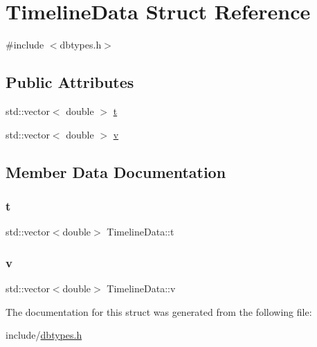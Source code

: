 \hypertarget{struct_timeline_data}{}\section{Timeline\+Data Struct Reference}
\label{struct_timeline_data}


{\ttfamily \#include $<$dbtypes.\+h$>$}

\subsection*{Public Attributes}
\begin{DoxyCompactItemize}
\item 
std\+::vector$<$ double $>$ \mbox{\hyperlink{struct_timeline_data_a55252a3a044701c453ad58cbf35b387c}{t}}
\item 
std\+::vector$<$ double $>$ \mbox{\hyperlink{struct_timeline_data_abb79949b8e51b0db53e7c569a9190ada}{v}}
\end{DoxyCompactItemize}


\subsection{Member Data Documentation}
\mbox{\label{struct_timeline_data_a55252a3a044701c453ad58cbf35b387c}} 
\subsubsection{\texorpdfstring{t}{t}}
{\footnotesize\ttfamily std\+::vector$<$double$>$ Timeline\+Data\+::t}

\mbox{\label{struct_timeline_data_abb79949b8e51b0db53e7c569a9190ada}} 
\subsubsection{\texorpdfstring{v}{v}}
{\footnotesize\ttfamily std\+::vector$<$double$>$ Timeline\+Data\+::v}



The documentation for this struct was generated from the following file\+:\begin{DoxyCompactItemize}
\item 
include/\mbox{\hyperlink{dbtypes_8h}{dbtypes.\+h}}\end{DoxyCompactItemize}
